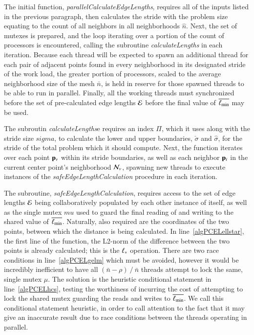 The initial function, \textit{parallelCalculateEdgeLengths}, requires all of the inputs listed in the previous paragraph, then calculates the stride with the problem size equating to the count of all neighbors in all neighborhoods $\hat{n}$. Next, the set of mutexes is prepared, and the loop iterating over a portion of the count of processors is encountered, calling the subroutine \textit{calculateLengths} in each iteration. Because each thread will be expected to spawn an additional thread for each pair of adjacent points found in every neighborhood in its designated stride of the work load, the greater portion of processors, scaled to the average neighborhood size of the mesh $\bar{n}$, is held in reserve for those spawned threads to be able to run in parallel. Finally, all the working threads must synchronized before the set of pre-calculated edge lengths $\mathcal{E}$ before the final value of $\overline{\ell_\text{min}}$ may be used.

The subroutin \textit{calculateLengths}e requires an index $\Pi$, which it uses along with the stride size $sigma$, to calculate the lower and upper boundaries, $\check{\sigma}$ and $\hat{\sigma}$, for the stride of the total problem which it should compute. Next, the function iterates over each point $\mathbf{p}_v$ within its stride boundaries, as well as each neighbor $\mathbf{p}_i$ in the current center point's neighborhood $\mathcal{N}_v$, spawning new threads to execute instances of the \textit{safeEdgeLengthCalculation} procedure in each iteration.

The subroutine, \textit{safeEdgeLengthCalculation}, requires access to the set of edge lengths $\mathcal{E}$ being collaboratively populated by each other instance of itself, as well as the single mutex $mu$ used to guard the final reading of and writing to the shared value of $\overline{\ell_\text{min}}$. Naturally, also required are the coordinates of the two points, between which the distance is being calculated. In line~\ref{algPCELellstar}, the first line of the function, the L2-norm of the difference between the two points is already calculated; this is the $\ell_\ast$ operation. There are two race conditions in line~\ref{algPCELgelm} which must be avoided, however it would be incredibly inefficient to have all $(\bar{n}-\rho)\mathbin{/}\bar{n}$ threads attempt to lock the same, single mutex $\mu$. The solution is the heuristic conditional statement in line~\ref{algPCELhcs}, testing the worthiness of incurring the cost of attempting to lock the shared mutex guarding the reads and writes to $\overline{\ell_\text{min}}$. We call this conditional statement heuristic, in order to call attention to the fact that it may give an inaccurate result due to race conditions between the threads operating in parallel. 

